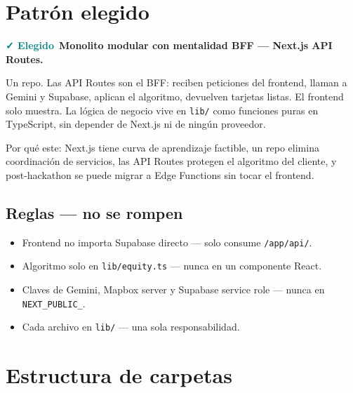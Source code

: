 \documentclass[11pt,a4paper]{article}
\newcommand{\elegido}{\textcolor{teal}{\textbf{✓ Elegido}}}
\newcommand{\f}[1]{\texttt{\textcolor{d}{#1}}}
\begin{document}
\section{Patrón elegido}

\elegido\ \textbf{Monolito modular con mentalidad BFF — Next.js API Routes.}

Un repo. Las API Routes son el BFF: reciben peticiones del frontend,
llaman a Gemini y Supabase, aplican el algoritmo, devuelven tarjetas listas.
El frontend solo muestra. La lógica de negocio vive en \f{lib/} como
funciones puras en TypeScript, sin depender de Next.js ni de ningún proveedor.

Por qué este: Next.js tiene curva de aprendizaje factible, un repo elimina coordinación de
servicios, las API Routes protegen el algoritmo del cliente, y post-hackathon
se puede migrar a Edge Functions sin tocar el frontend.

\subsection{Reglas — no se rompen}

\begin{itemize}[leftmargin=*, itemsep=2pt]
  \item Frontend no importa Supabase directo — solo consume \f{/app/api/}.
  \item Algoritmo solo en \f{lib/equity.ts} — nunca en un componente React.
  \item Claves de Gemini, Mapbox server y Supabase service role — nunca en
        \texttt{NEXT\_PUBLIC\_}.
  \item Cada archivo en \f{lib/} — una sola responsabilidad.
\end{itemize}

\section{Estructura de carpetas}
\end{document}
